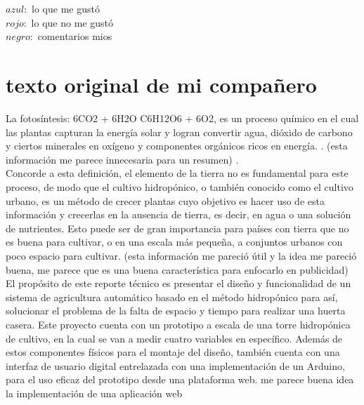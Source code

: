 \documentclass[10pt,a4paper]{article} %
\begin{document}
    \title{\rmfamily\normalfont{}}
    \author{}
    \date{\today}

    \maketitle
    \\
        \\ \color{blue} $ azul:  $ lo que me gustó \color{black}
        \\ \color{forestgreen} $ rojo:  $ lo que no me gustó \color{black}
        \\ \color{black} $ negro:  $ comentarios mios \color{black}
    \section{texto original de mi compañero}

        \color{red} La fotosíntesis: 6CO2 + 6H2O C6H12O6 + 6O2, es un proceso químico en el cual
        las plantas capturan la energía solar y logran convertir agua, dióxido de
        carbono y ciertos minerales en oxígeno y componentes orgánicos ricos en
        energía. \color{black} . \color{black} (esta información me parece
        innecesaria para un resumen) \color{white} .
        \\
        \color{blue} Concorde a esta definición, el elemento de la tierra no es fundamental
        para este proceso, de modo que el cultivo hidropónico, o también conocido como
        el cultivo urbano, es un método de crecer plantas cuyo objetivo es hacer uso de
        esta información y crecerlas en la ausencia de tierra, es decir, en agua o una
        solución de nutrientes. Esto puede ser de gran importancia para países con
        tierra que no es buena para cultivar, o en una escala más pequeña, a conjuntos
        urbanos con poco espacio para cultivar.  \color{black}(esta información
        me pareció útil y la idea me pareció buena, me parece que es una buena
        característica para enfocarlo en publicidad) \\

        \color{blue} El propósito de este reporte técnico es presentar el diseño y funcionalidad de
        un sistema de agricultura automático basado en el método hidropónico para así,
        solucionar el problema de la falta de espacio y tiempo para realizar una huerta
        casera. Este proyecto cuenta con un prototipo a escala de una torre hidropónica
        de cultivo, en la cual se van a medir cuatro variables en específico. Además de
        estos componentes físicos para el montaje del diseño, también cuenta con una
        interfaz de usuario digital entrelazada con una implementación de un Arduino,
        para el uso eficaz del prototipo desde una plataforma web.
        \color{black}  me parece buena idea la implementación de una aplicación
        web\\
\end{document}
